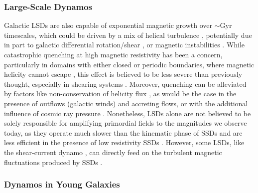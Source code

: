 \subsubsection{Large-Scale Dynamos}

Galactic LSDs are also capable of exponential magnetic growth over $\sim \mathrm{Gyr}$ timescales, which could be driven by a mix of helical turbulence \citep[\eg][]{bhat2016unified, rincon2021helical}, potentially due in part to galactic differential rotation/shear \citep[\eg][]{vishniac1997incoherent, kapyla2008large, squire2015generation, gent2023transition}, or magnetic instabilities \citep[\eg][]{johansen2008high, qazi2023nonlinear}. While catastrophic quenching at high magnetic resistivity has been a concern, particularly in domains with either closed or periodic boundaries, where magnetic helicity cannot escape \citep[see][]{vishniac2001magnetic}, this effect is believed to be less severe than previously thought, especially in shearing systems \citep{hubbard2012catastrophic}. Moreover, quenching can be alleviated by factors like non-conservation of helicity flux \citep{verma2003energy, sur2007galactic, del2013turbulent}, as would be the case in the presence of outflows (\eg galactic winds) and accreting flows, or with the additional influence of cosmic ray pressure \citep{parker1992fast, hanasz2004amplification}. Nonetheless, LSDs alone are not believed to be solely responsible for amplifying primordial fields to the magnitudes we observe today, as they operate much slower than the kinematic phase of SSDs \citep{schober2012magnetic, gent2023transition} and are less efficient in the presence of low resistivity SSDs \cite[\eg][]{gent2023transition}. However, some LSDs, like the shear-current dynamo \citep{squire2015generation}, can directly feed on the turbulent magnetic fluctuations produced by SSDs \citep[see][for a recent, thorough review of LSDs]{brandenburg2023galactic}.

\subsubsection{Dynamos in Young Galaxies}

